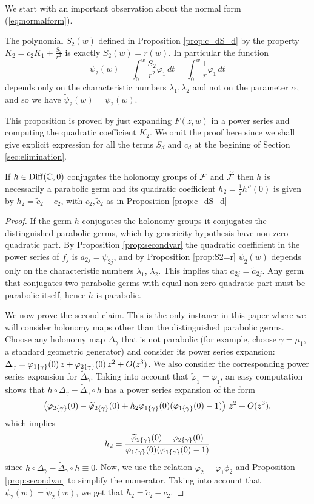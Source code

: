 We start with an important observation about the normal form (\ref{eq:normalform}).

\begin{proposition}\label{prop:S2=r}
 The polynomial $S_2(w)$ defined in Proposition \textnormal{\ref{prop:c_dS_d}} by the property $K_2=c_2K_1+\frac{S_2}{r^2}$ is exactly $S_2(w)=r(w)$. In particular the function  
\[ \psi_2(w)=\int_0^w\frac{S_2}{r^2}\varphi_1\,dt=\int_0^w\frac{1}{r}\varphi_1\,dt \]
depends only on the characteristic numbers $\lambda_1,\lambda_2$ and not on the parameter $\alpha$, and so we have $\tilde{\psi}_2(w)=\psi_2(w)$.
\end{proposition}

This proposition is proved by just expanding $F(z,w)$ in a power series and computing the quadratic coefficient $K_2$. We omit the proof here since we shall give explicit expression for all the terms $S_d$ and $c_d$ at the begining of Section \ref{sec:elimination}.

\begin{proposition}\label{prop:h2}
If $h\in\operatorname{Diff}(\mathbb{C},0)$ conjugates the holonomy groups of $\mathcal{F}$ and $\widetilde{\mathcal{F}}$ then $h$ is necessarily a parabolic germ and its quadratic coefficient $h_2=\frac{1}{2}h''(0)$ is given by $h_2=\tilde{c}_2-c_2$, with $c_2,\tilde{c}_2$ as in Proposition \textnormal{\ref{prop:c_dS_d}}
\end{proposition}

\begin{proof}
If the germ $h$ conjugates the holonomy groups it conjugates the distinguished parabolic germs, which by genericity hypothesis have non-zero quadratic part. By Proposition \ref{prop:secondvar} the quadratic coefficient in the power series of $f_j$ is $a_{2j}=\psi_{2j}$, and by Proposition \ref{prop:S2=r} $\psi_2(w)$ depends only on the characteristic numbers $\lambda_1$, $\lambda_2$. This implies that $a_{2j}=\tilde{a}_{2j}$. Any germ that conjugates two parabolic germs with equal non-zero quadratic part must be parabolic itself, hence $h$ is parabolic.

We now prove the second claim. This is the only instance in this paper where we will consider holonomy maps other than the distinguished parabolic germs. Choose any holonomy map $\Delta_\gamma$ that is not parabolic (for example, choose $\gamma=\mu_1$, a standard geometric generator) and consider its power series expansion: $\Delta_\gamma=\varphi_{{1}\{\gamma_{{}}\}}(0)\,z+\varphi_{{2}\{\gamma_{{}}\}}(0)\,z^2+O(z^3)$. We also consider the corresponding power series expansion for $\widetilde{\Delta}_\gamma$. Taking into account that $\widetilde{\varphi}_1=\varphi_1$, an easy computation shows that $h\circ\Delta_\gamma-\widetilde{\Delta}_\gamma\circ h$ has a power series expansion of the form
\[ \left(\varphi_{{2}\{\gamma_{{}}\}}(0)-\widetilde{\varphi}_{{2}\{\gamma_{{}}\}}(0)+h_2\varphi_{{1}\{\gamma_{{}}\}}(0)(\varphi_{{1}\{\gamma_{{}}\}}(0)-1)\right)\,z^2+O(z^3), \]
which implies
\[ h_2=\frac{\widetilde{\varphi}_{{2}\{\gamma_{{}}\}}(0)-\varphi_{{2}\{\gamma_{{}}\}}(0)}{\varphi_{{1}\{\gamma_{{}}\}}(0)(\varphi_{{1}\{\gamma_{{}}\}}(0)-1)} \]
since $h\circ\Delta_\gamma-\widetilde{\Delta}_\gamma\circ h\equiv 0$. Now, we use the relation $\varphi_2=\varphi_1\phi_2$ and Proposition \ref{prop:secondvar} to simplify the numerator. Taking into account that $\psi_2(w)=\tilde{\psi}_2(w)$, we get that $h_2=\tilde{c}_2-c_2$.
\end{proof}

